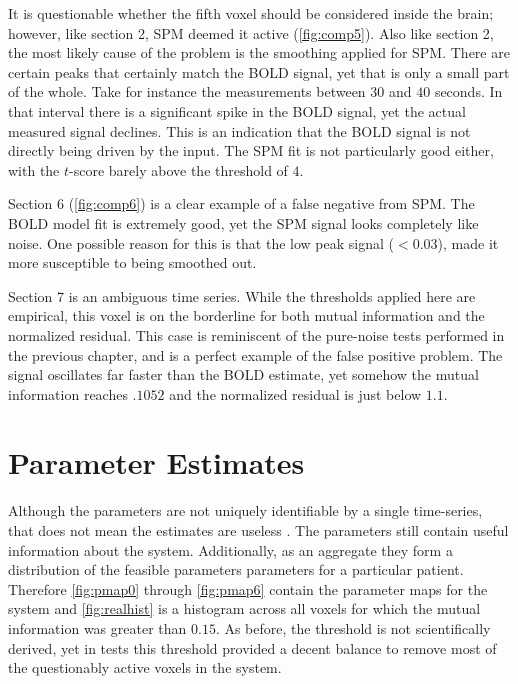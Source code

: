 It is questionable whether the fifth voxel should be considered inside the
brain; however, like section 2, \ac{SPM} deemed it active (\autoref{fig:comp5}).
Also like section 2, the most likely cause of the problem is the smoothing
applied for \ac{SPM}. There are certain peaks that certainly match the
\ac{BOLD} signal, yet that is only a small part of the whole.
Take for instance the measurements between $30$ and $40$ seconds.
In that interval there is a significant spike in the \ac{BOLD} signal, yet the
actual measured signal declines. This is an indication that the \ac{BOLD} signal is not directly
being driven by the input. The \ac{SPM} fit is not particularly good either,
with the $t$-score barely above the threshold of $4$.

Section 6 (\autoref{fig:comp6}) is a clear example of a false negative
from \ac{SPM}. The \ac{BOLD} model fit is extremely good, yet the \ac{SPM} signal looks completely
like noise. One possible reason for this is that the low peak signal ($<0.03$),
made it more susceptible to being smoothed out.

Section 7 is an ambiguous time series. While the thresholds applied here
are empirical, this voxel is on the borderline for both mutual information
and the normalized residual.
This case is reminiscent of the pure-noise tests performed in the previous chapter,
and is a perfect example of the false positive problem.
The signal oscillates far faster than the \ac{BOLD} estimate, yet
somehow the mutual information reaches $.1052$ and the normalized residual is just below $1.1$.

\section{Parameter Estimates}
\label{sec:Real Data Parameter Estimates}
Although the parameters are not uniquely identifiable by a single time-series, that
does not mean the estimates are useless . The parameters still contain useful
information about the system. Additionally, as an aggregate they form a distribution of
the feasible parameters parameters for a particular patient. Therefore
\autoref{fig:pmap0} through \autoref{fig:pmap6}
contain the parameter maps for the system and \autoref{fig:realhist} is a histogram across all voxels
for which the mutual information was greater than $0.15$. As before, the threshold is not
scientifically derived, yet in tests this threshold provided a decent balance to remove most
of the questionably active voxels in the system.

